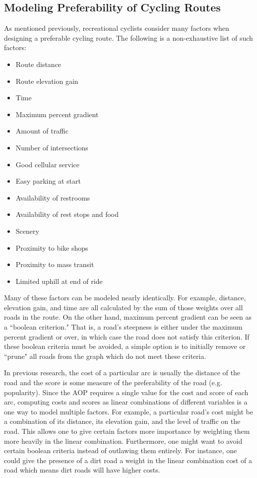 \documentclass[11pt]{article}
\begin{document}
\subsection{Modeling Preferability of Cycling Routes} \label{routefactors}
As mentioned previously, recreational cyclists consider many factors when designing a preferable cycling route. The following is a non-exhaustive list of such factors:

\begin{multicols}{2}
\begin{itemize}
    \item Route distance
    \item Route elevation gain
    \item Time
    \item Maximum percent gradient
    \item Amount of traffic
    \item Number of intersections
    \item Good cellular service
    \item Easy parking at start
    \item Availability of restrooms
    \item Availability of rest stops and food
    \item Scenery
    \item Proximity to bike shops
    \item Proximity to mass transit
    \item Limited uphill at end of ride
\end{itemize}    
\end{multicols}

Many of these factors can be modeled nearly identically. For example, distance, elevation gain, and time are all calculated by the sum of those weights over all roads in the route. On the other hand, maximum percent gradient can be seen as a ``boolean criterion." That is, a road's steepness is either under the maximum percent gradient or over, in which case the road does not satisfy this criterion. If these boolean criteria must be avoided, a simple option is to initially remove or ``prune" all roads from the graph which do not meet these criteria.

In previous research, the cost of a particular arc is usually the distance of the  road and the score is some measure of the preferability of the road (e.g. popularity). Since the AOP requires a single value for the cost and score of each arc, computing costs and scores as linear combinations of different variables is a one way to model multiple factors. For example, a particular road's cost might be a combination of its distance, its elevation gain, and the level of traffic on the road. This allows one to give certain factors more importance by weighting them more heavily in the linear combination. Furthermore, one might want to avoid certain boolean criteria instead of outlawing them entirely. For instance, one could give the presence of a dirt road a  weight in the linear combination cost of a road which means dirt roads will have higher costs.
\end{document}
